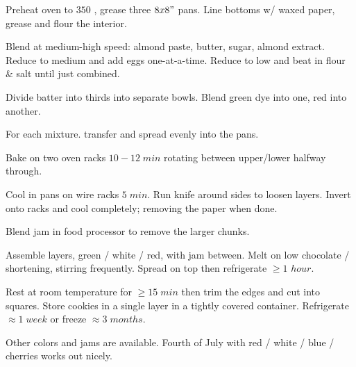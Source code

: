 \begin{preparation}
\item Preheat oven to $350$ \Fahrenheit, grease three $8x8"$ pans.
Line bottoms w/ waxed paper, grease and flour the interior.

\item Blend at medium-high speed: almond paste, butter, sugar, almond extract.
Reduce to medium and add eggs one-at-a-time.
Reduce to low and beat in flour \& salt until just combined.

\item Divide batter into thirds into separate bowls.
Blend green dye into one, red into another.

\item For each mixture. transfer and spread evenly into the pans.

\item Bake on two oven racks $10-12\; min$ rotating between upper/lower halfway through.

\item Cool in pans on wire racks $5\; min$.
Run knife around sides to loosen layers. Invert onto racks and cool completely; removing the paper when done.

\item Blend jam in food processor to remove the larger chunks.

\item Assemble layers, green / white / red, with jam between.
Melt on low chocolate / shortening, stirring frequently.
Spread on top then refrigerate $\geq1$ $hour$.

\item Rest at room temperature for $\geq 15\; min$ then trim the edges and cut into squares.
Store cookies in a single layer in a tightly covered container.
Refrigerate $\approx 1\; week$ or freeze $\approx 3\; months$.
\end{preparation}

\begin{variation}
\item Other colors and jams are available. Fourth of July with red / white / blue / cherries works out nicely.
\end{variation}
\recipeend
